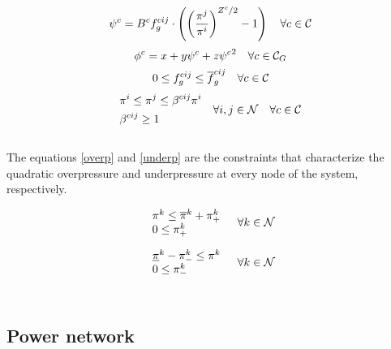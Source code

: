 \begin{equation}
\psi^{c} = {B^{c}}{f}^{cij}_{g} \cdot \left( {\left( \frac{\pi^{j}}{\pi^{i}} \right)}^{Z^{c} / 2} - 1 \right)   \quad \forall c \in {\cal{C}}
\label{hp_fc}
\end{equation}
\begin{equation} 
{\phi}^{c} = x + y \psi^{c} +  z {\psi^{c}}^{2}  \quad \forall c \in {\cal{C}}_{G}
\label{g_fc}
\end{equation}
\begin{equation}
0 \le {f}^{cij}_{g} \le \overline{f}^{cij}_{g}  \quad \forall c \in {\cal{C}}
\label{gfa_limits}
\end{equation}
\begin{equation}
\begin{aligned}
&\pi^{i} \le \pi^{j} \le \beta^{cij} \pi^{i}\\
&\beta^{cij} \ge 1 \\
\end{aligned}
\quad \forall i,j \in {\cal{N}} \quad \forall c \in {\cal{C}}
\label{presa_rel}
\end{equation}
\\

The equations \ref{overp} and \ref{underp} are the constraints that characterize the quadratic overpressure and underpressure at every node of the system, respectively. 

\begin{equation}
\begin{array}{l}
 \pi^{k} \le \overline{\pi}^{k} + \pi^{k}_{+}\\
 0 \le \pi^{k}_{+}\\
\end{array} 
\quad \forall k  \in {\cal{N}}\\ 
\label{overp}
\end{equation}

\begin{equation}
\begin{array}{l}
\underline{\pi}^{k} - \pi^{k}_{-} \le \pi^{k}\\
0 \le \pi^{k}_{-}\\
\end{array} 
\quad \forall k  \in {\cal{N}}\\ 
\label{underp}
\end{equation}
\\

\subsection{Power network}

